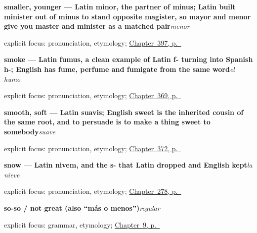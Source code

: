 \noindent\begin{minipage}[t]{\linewidth}
\raggedright
\textbf{smaller, younger — Latin minor, the partner of minus; Latin built minister out of minus to stand opposite magister, so mayor and menor give you master and minister as a matched pair}\enspace\emph{menor}\par
\footnotesize explicit focus: pronunciation, etymology; \hyperref[ch:barato-y-caro]{Chapter~397, p.~\pageref*{ch:barato-y-caro}}
\end{minipage}\par\smallskip

\noindent\begin{minipage}[t]{\linewidth}
\raggedright
\textbf{smoke — Latin fumus, a clean example of Latin f- turning into Spanish h-; English has fume, perfume and fumigate from the same word}\enspace\emph{el humo}\par
\footnotesize explicit focus: pronunciation, etymology; \hyperref[ch:el-rio-y-la-arena]{Chapter~369, p.~\pageref*{ch:el-rio-y-la-arena}}
\end{minipage}\par\smallskip

\noindent\begin{minipage}[t]{\linewidth}
\raggedright
\textbf{smooth, soft — Latin suavis; English sweet is the inherited cousin of the same root, and to persuade is to make a thing sweet to somebody}\enspace\emph{suave}\par
\footnotesize explicit focus: pronunciation, etymology; \hyperref[ch:gris-y-rosa]{Chapter~372, p.~\pageref*{ch:gris-y-rosa}}
\end{minipage}\par\smallskip

\noindent\begin{minipage}[t]{\linewidth}
\raggedright
\textbf{snow — Latin nivem, and the s- that Latin dropped and English kept}\enspace\emph{la nieve}\par
\footnotesize explicit focus: pronunciation, etymology; \hyperref[ch:al-aire-libre]{Chapter~278, p.~\pageref*{ch:al-aire-libre}}
\end{minipage}\par\smallskip

\noindent\begin{minipage}[t]{\linewidth}
\raggedright
\textbf{so-so / not great (also \textquotedblleft{}más o menos\textquotedblright{})}\enspace\emph{regular}\par
\footnotesize explicit focus: grammar, etymology; \hyperref[ch:answering]{Chapter~9, p.~\pageref*{ch:answering}}
\end{minipage}\par\smallskip

